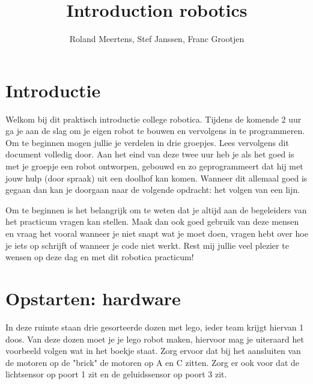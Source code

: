 \documentclass[11pt]{article} %
\title{Introduction robotics}
\author{Roland Meertens, Stef Janssen, Franc Grootjen}
\begin{document}
\maketitle
\section*{Introductie}
Welkom bij dit praktisch introductie college robotica. 
Tijdens de komende 2 uur ga je aan de slag om je eigen robot te bouwen en vervolgens in te programmeren. 
Om te beginnen mogen jullie je verdelen in drie groepjes. Lees vervolgens dit document volledig door. 
Aan het eind van deze twee uur heb je als het goed is met je groepje een robot ontworpen, gebouwd en zo geprogrammeert dat hij met jouw hulp (door spraak) uit een doolhof kan komen. 
Wanneer dit allemaal goed is gegaan dan kan je doorgaan naar de volgende opdracht: het volgen van een lijn. 

Om te beginnen is het belangrijk om te weten dat je altijd aan de begeleiders van het practicum vragen kan stellen.
Maak dan ook goed gebruik van deze mensen en vraag het vooral wanneer je niet snapt wat je moet doen, vragen hebt over hoe je iets op schrijft of wanneer je code niet werkt. 
Rest mij jullie veel plezier te wensen op deze dag en met dit robotica practicum!

\section*{Opstarten: hardware}
In deze ruimte staan drie gesorteerde dozen met lego, ieder team krijgt hiervan 1 doos.   
Van deze dozen moet je je lego robot maken, hiervoor mag je uiteraard het voorbeeld volgen wat in het boekje staat. 
Zorg ervoor dat bij het aansluiten van de motoren op de "brick" de motoren op A en C zitten. 
Zorg er ook voor dat de lichtsensor op poort 1 zit en de geluidssensor op poort 3 zit. 
\end{document}
